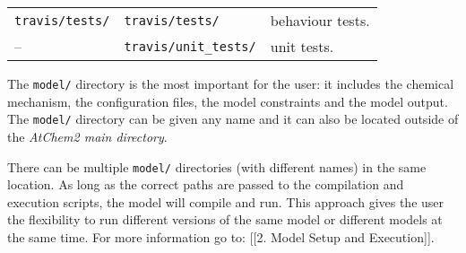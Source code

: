 \begin{longtable}[]{@{}lll@{}}
\begin{minipage}[t]{0.20\columnwidth}\raggedright
\texttt{travis/tests/}\strut
\end{minipage} & \begin{minipage}[t]{0.24\columnwidth}\raggedright
\texttt{travis/tests/}\strut
\end{minipage} & \begin{minipage}[t]{0.48\columnwidth}\raggedright
behaviour tests.\strut
\end{minipage}\tabularnewline
\begin{minipage}[t]{0.20\columnwidth}\raggedright
--\strut
\end{minipage} & \begin{minipage}[t]{0.24\columnwidth}\raggedright
\texttt{travis/unit\_tests/}\strut
\end{minipage} & \begin{minipage}[t]{0.48\columnwidth}\raggedright
unit tests.\strut
\end{minipage}\tabularnewline
\end{longtable}

The \texttt{model/} directory is the most important for the user: it
includes the chemical mechanism, the configuration files, the model
constraints and the model output. The \texttt{model/} directory can be
given any name and it can also be located outside of the \emph{AtChem2
main directory}.

There can be multiple \texttt{model/} directories (with different names)
in the same location. As long as the correct paths are passed to the
compilation and execution scripts, the model will compile and run. This
approach gives the user the flexibility to run different versions of the
same model or different models at the same time. For more information go
to: {[}{[}2. Model Setup and Execution{]}{]}.
